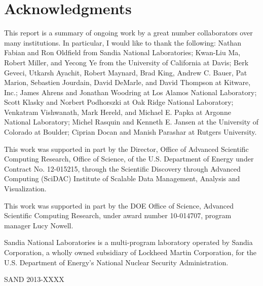 \documentclass[conference]{IEEEtran}
\begin{document}
\section*{Acknowledgments}

\noindent
This report is a summary of ongoing work by a great number collaborators
over many institutions.  In particular, I would like to thank the
following: Nathan Fabian and Ron Oldfield from Sandia National
Laboratories; Kwan-Liu Ma, Robert Miller, and Yecong Ye from the University
of California at Davis; Berk Geveci, Utkarsh Ayachit, Robert Maynard, Brad
King, Andrew C. Bauer, Pat Marion, Sebastien Jourdain, David DeMarle, and
David Thompson at Kitware, Inc.; James Ahrens and Jonathan Woodring at Los
Alamos National Laboratory; Scott Klasky and Norbert Podhorszki at Oak
Ridge National Laboratory; Venkatram Vishwanath, Mark Hereld, and Michael
E. Papka at Argonne National Laboratory; Michel Rasquin and Kenneth
E. Jansen at the University of Colorado at Boulder; Ciprian Docan and
Manish Parashar at Rutgers University.


This work was supported in part by the Director, Office of Advanced
Scientific Computing Research, Office of Science, of the U.S. Department of
Energy under Contract No. 12-015215, through the Scientific Discovery
through Advanced Computing (SciDAC) Institute of Scalable Data Management,
Analysis and Visualization.

This work was supported in part by the DOE Office of Science, Advanced
Scientific Computing Research, under award number 10-014707, program
manager Lucy Nowell.

Sandia National Laboratories is a multi-program laboratory operated by
Sandia Corporation, a wholly owned subsidiary of Lockheed Martin
Corporation, for the U.S. Department of Energy's National Nuclear Security
Administration.

\noindent
{\small SAND 2013-XXXX}



\end{document}
